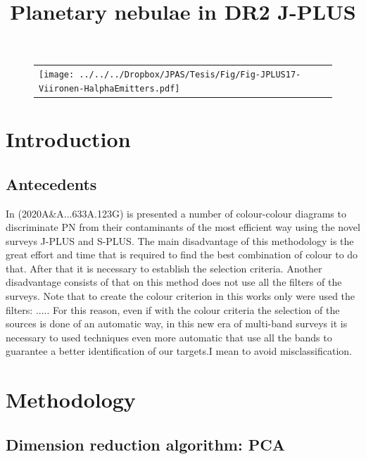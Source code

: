 \documentclass[11pt]{article}
\title{Planetary nebulae in DR2 J-PLUS }
\date{}
\begin{document}
\maketitle

\begin{figure}
\centering
\begin{tabular}{l l}
  \texttt{[image: ../../../Dropbox/JPAS/Tesis/Fig/Fig-JPLUS17-Viironen-HalphaEmitters.pdf]}
  \end{tabular}  
\end{figure}

\section{Introduction}
\label{sec:into}

\subsection{Antecedents}
\label{sec:antec}

In (2020A\&A...633A.123G) is presented a number of colour-colour diagrams to discriminate PN from their contaminants of the most efficient way using the novel surveys J-PLUS and S-PLUS. The main disadvantage of this methodology is the great effort and time that is required to find the best combination of colour to do that. After that it is necessary to establish the selection criteria. Another disadvantage consists of that on this method does not use all the filters of the surveys. Note that to create the colour criterion in this works only were used the filters: ..... For this reason, even if with the colour criteria the selection of the sources is done of an automatic way, in this new era of multi-band surveys it is necessary to used techniques even more automatic that use all the bands to guarantee a better identification of our targets.I mean to avoid misclassification.        
 
\section{Methodology}
\label{sec:into}

\subsection{Dimension reduction algorithm: PCA}
\label{sec:pca-lda}
\end{document}
